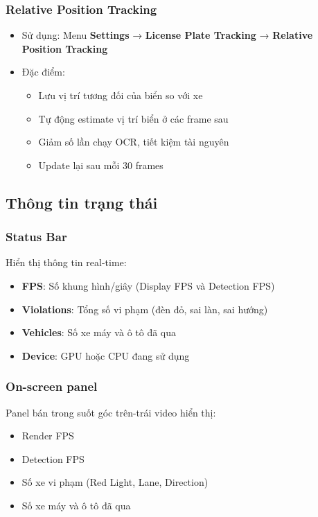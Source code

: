 \subsubsection{Relative Position Tracking}
\begin{itemize}
    \item Sử dụng: Menu \textbf{Settings} → \textbf{License Plate Tracking} → \textbf{Relative Position Tracking}
    \item Đặc điểm:
    \begin{itemize}
        \item Lưu vị trí tương đối của biển so với xe
        \item Tự động estimate vị trí biển ở các frame sau
        \item Giảm số lần chạy OCR, tiết kiệm tài nguyên
        \item Update lại sau mỗi 30 frames
    \end{itemize}
\end{itemize}

\subsection{Thông tin trạng thái}

\subsubsection{Status Bar}
Hiển thị thông tin real-time:
\begin{itemize}
    \item \textbf{FPS}: Số khung hình/giây (Display FPS và Detection FPS)
    \item \textbf{Violations}: Tổng số vi phạm (đèn đỏ, sai làn, sai hướng)
    \item \textbf{Vehicles}: Số xe máy và ô tô đã qua
    \item \textbf{Device}: GPU hoặc CPU đang sử dụng
\end{itemize}

\subsubsection{On-screen panel}
Panel bán trong suốt góc trên-trái video hiển thị:
\begin{itemize}
    \item Render FPS
    \item Detection FPS
    \item Số xe vi phạm (Red Light, Lane, Direction)
    \item Số xe máy và ô tô đã qua
\end{itemize}

